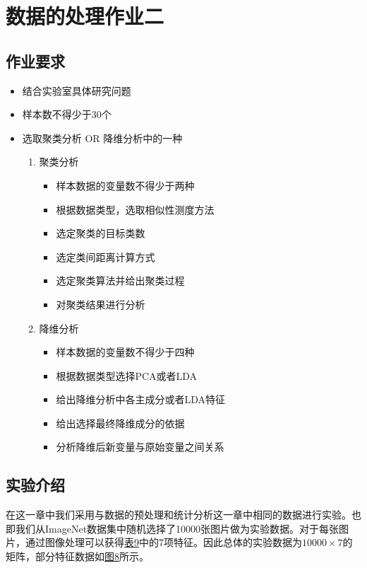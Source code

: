 \documentclass[UTF8]{ctexart}
\begin{document}
	\section{数据的处理作业二}
		
	\subsection{作业要求}
	
	\begin{itemize}
		\item 结合实验室具体研究问题
		\item 样本数不得少于30个
		\item 选取聚类分析 OR 降维分析中的一种
		\begin{enumerate}
			\item 聚类分析
			\begin{itemize}
				\item 样本数据的变量数不得少于两种
				\item 根据数据类型，选取相似性测度方法
				\item 选定聚类的目标类数
				\item 选定类间距离计算方式
				\item 选定聚类算法并给出聚类过程
				\item 对聚类结果进行分析
			\end{itemize} 
			\item 降维分析
			\begin{itemize}
				\item 样本数据的变量数不得少于四种
				\item 根据数据类型选择PCA或者LDA
				\item 给出降维分析中各主成分或者LDA特征
				\item 给出选择最终降维成分的依据
				\item 分析降维后新变量与原始变量之间关系
			\end{itemize} 
		\end{enumerate}
	
	\end{itemize} 

	\subsection{实验介绍}
	
	在这一章中我们采用与数据的预处理和统计分析这一章中相同的数据进行实验。也即我们从ImageNet数据集中随机选择了10000张图片做为实验数据。对于每张图片，通过图像处理可以获得\hyperref[Chart.9]{表9}中的7项特征。因此总体的实验数据为$10000 \times 7$的矩阵，部分特征数据如\hyperref[Fig.8]{图8}所示。
	
\end{document}
